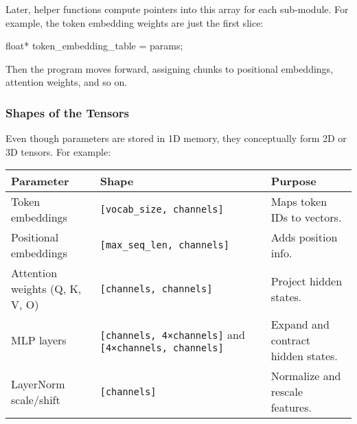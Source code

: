\documentclass[
  letterpaper,
  DIV=11,
  numbers=noendperiod]{scrreprt}
\newenvironment{Shaded}{\begin{snugshade}}{\end{snugshade}}
\newcommand{\DataTypeTok}[1]{\textcolor[rgb]{0.68,0.00,0.00}{#1}}
\newcommand{\NormalTok}[1]{\textcolor[rgb]{0.00,0.23,0.31}{#1}}
\newcommand{\OperatorTok}[1]{\textcolor[rgb]{0.37,0.37,0.37}{#1}}
\begin{document}
Later, helper functions compute pointers into this array for each
sub-module. For example, the token embedding weights are just the first
slice:

\begin{Shaded}
\begin{Highlighting}[]
\DataTypeTok{float}\OperatorTok{*}\NormalTok{ token\_embedding\_table }\OperatorTok{=}\NormalTok{ params}\OperatorTok{;}
\end{Highlighting}
\end{Shaded}

Then the program moves forward, assigning chunks to positional
embeddings, attention weights, and so on.

\subsubsection{Shapes of the Tensors}\label{shapes-of-the-tensors}

Even though parameters are stored in 1D memory, they conceptually form
2D or 3D tensors. For example:

\begin{longtable}[]{@{}
  >{\raggedright\arraybackslash}p{}
  >{\raggedright\arraybackslash}p{}
  >{\raggedright\arraybackslash}p{}@{}}
\toprule\noalign{}
\begin{minipage}[b]{\linewidth}\raggedright
Parameter
\end{minipage} & \begin{minipage}[b]{\linewidth}\raggedright
Shape
\end{minipage} & \begin{minipage}[b]{\linewidth}\raggedright
Purpose
\end{minipage} \\
\midrule\noalign{}
\endhead
\bottomrule\noalign{}
\endlastfoot
Token embeddings & \texttt{{[}vocab\_size,\ channels{]}} & Maps token
IDs to vectors. \\
Positional embeddings & \texttt{{[}max\_seq\_len,\ channels{]}} & Adds
position info. \\
Attention weights (Q, K, V, O) & \texttt{{[}channels,\ channels{]}} &
Project hidden states. \\
MLP layers & \texttt{{[}channels,\ 4×channels{]}} and
\texttt{{[}4×channels,\ channels{]}} & Expand and contract hidden
states. \\
LayerNorm scale/shift & \texttt{{[}channels{]}} & Normalize and rescale
features. \\
\end{longtable}
\end{document}
